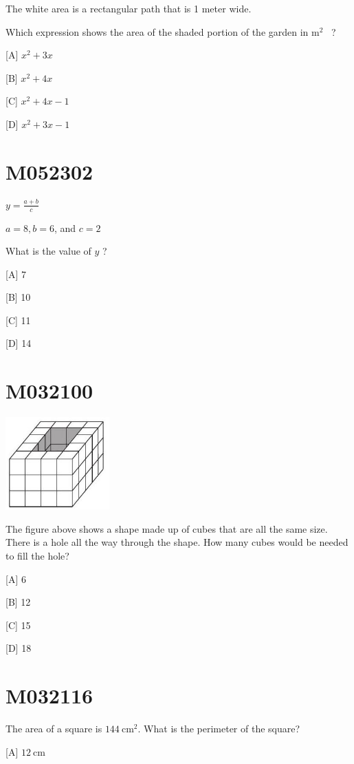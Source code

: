 \documentclass[12pt]{article}
\begin{document}
The white area is a rectangular path that is 1 meter wide.

Which expression shows the area of the shaded portion of the garden in $\mathrm{m}^{2}$~ ?

[A] $x^{2}+3 x$

[B] $x^{2}+4 x$

[C] $x^{2}+4 x-1$

[D] $x^{2}+3 x-1$

\newpage
\section*{M052302}

$y=\frac{a+b}{c}$

$a=8, b=6$, and $c=2$

What is the value of $y$ ?

[A] 7

[B] 10

[C] 11

[D] 14

\newpage
\section*{M032100}


\includegraphics[max width=0.3\textwidth]{2024_02_20_828ebc9d68bcc1fbb223g-51}


The figure above shows a shape made up of cubes that are all the same size. There is a hole all the way through the shape. How many cubes would be needed to fill the hole?

[A] 6

[B] 12

[C] 15

[D] 18

\newpage
\section*{M032116}

The area of a square is $144 \mathrm{~cm}^{2}$. What is the perimeter of the square?

[A] $12 \mathrm{~cm}$
\end{document}
